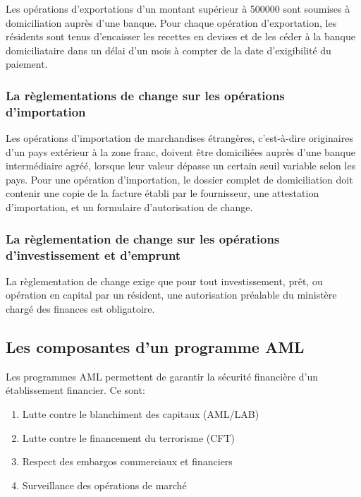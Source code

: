 Les opérations d'exportations d'un montant supérieur à 500000 sont soumises à
domiciliation auprès d'une banque. Pour chaque opération 
d'exportation, les résidents sont tenus d'encaisser les recettes en devises 
et de les céder à la banque domiciliataire dans un délai d'un mois à compter
de la date d'exigibilité du paiement.
 
\subsubsection{La règlementations de change sur les opérations d'importation}

Les opérations d'importation de marchandises étrangères, c'est-à-dire originaires
d'un pays extérieur à la zone franc, doivent être domiciliées auprès d'une banque
intermédiaire agréé, lorsque leur valeur dépasse un certain seuil variable selon 
les pays.\cite{reglementfin}
Pour une opération d'importation, le dossier complet de domiciliation doit contenir
une copie de la facture établi par le fournisseur, une attestation d'importation,
et un formulaire d'autorisation de change.
 
\subsubsection{La règlementation de change sur les opérations d'investissement et
d'emprunt}
La règlementation de change exige que pour tout investissement, prêt, ou
opération en capital par un résident, une autorisation préalable du ministère
chargé des finances est obligatoire.
 
\subsection{Les composantes d'un programme AML}

Les programmes AML permettent de garantir la sécurité financière d'un
établissement financier. Ce sont:
 \begin{enumerate}
   \item Lutte contre le blanchiment des capitaux
     (AML/LAB)
   \item Lutte contre le financement du terrorisme
     (CFT)
   \item Respect des embargos commerciaux et financiers
   \item Surveillance des opérations de marché
 \end{enumerate}
 
